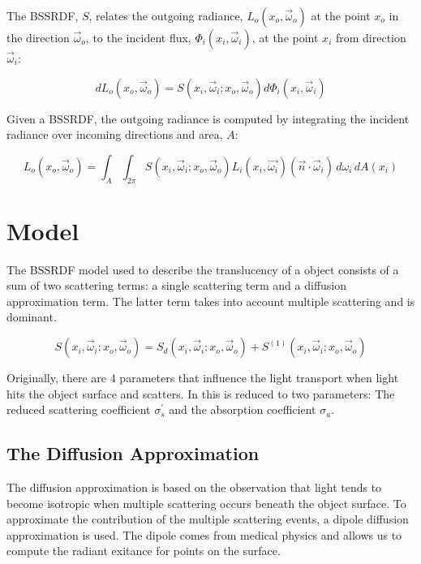 \documentclass{article}
\begin{document}
The BSSRDF, $S$, relates the outgoing radiance, $L _o(x _o, \vec{\omega} _o)$ at the point $x _o$ in the direction $\vec{\omega} _o$, to the incident flux, $\Phi _i(x _i, \vec{\omega} _i)$, at the point $x _i$ from direction $\vec{\omega} _i$:

\begin{equation}
dL _o(x _o, \vec{\omega} _o) = S(x _i, \vec{\omega} _i; x _o, \vec{\omega} _o) d\Phi _i(x _i, \vec{\omega} _i)
\end{equation}

Given a BSSRDF, the outgoing radiance is computed by integrating the incident radiance over incoming directions and area, $A$:

\begin{equation}
L _o(x _o, \vec{\omega} _o) = 
\int_{A}\int _{2\pi} S(x _i, \vec{\omega} _i; x _o, \vec{\omega} _o) L_i(x_i, \vec{\omega_i})(\vec{n} \cdotp \vec{\omega}_i) \,d\omega_i \,dA(x_i)
\end{equation}

\section{Model}
The BSSRDF model used to describe the translucency of a object consists of a sum of two scattering terms: a single scattering term and a diffusion approximation term.\cite{PracticalSSS} The latter term takes into account multiple scattering and is dominant.

\begin{equation}
S(x _i, \vec{\omega} _i; x _o, \vec{\omega} _o) =  {S}_{d}(x _i, \vec{\omega} _i; x _o, \vec{\omega} _o) + {S}^{(1)}(x _i, \vec{\omega} _i; x _o, \vec{\omega} _o)
\end{equation}

Originally, there are 4 parameters that influence the light transport when light hits the object surface and scatters. In \cite{HierarchicalSSS} this is reduced to two parameters: The reduced scattering coefficient ${\sigma}^{\prime}_s$ and the absorption coefficient $\sigma_{ a }$. 


\subsection{The Diffusion Approximation}
The diffusion approximation is based on the observation that light tends to become isotropic when multiple scattering occurs beneath the object surface. To approximate the contribution of the multiple scattering events, a dipole diffusion approximation is used. The dipole comes from medical physics and allows us to compute the radiant exitance for points on the surface.
\end{document}

